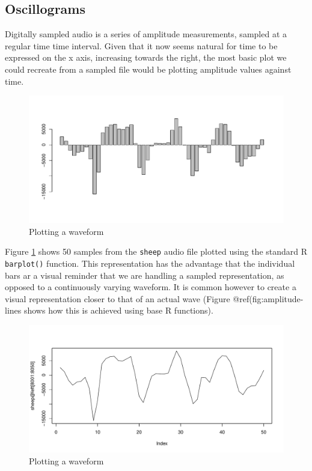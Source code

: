 \documentclass[
]{book}
\begin{document}
\hypertarget{oscillograms}{%
\subsection{Oscillograms}\label{oscillograms}}

Digitally sampled audio is a series of amplitude measurements, sampled at a regular time time interval. Given that it now seems natural for time to be expressed on the x axis, increasing towards the right, the most basic plot we could recreate from a sampled file would be plotting amplitude values against time.

\begin{figure}

{\centering \includegraphics[width=0.9\linewidth]{_main_files/figure-latex/amplitude-bars-1} 

}

\caption{Plotting a waveform}\label{fig:amplitude-bars}
\end{figure}

Figure \ref{fig:amplitude-bars} shows 50 samples from the \texttt{sheep} audio file plotted using the standard R \texttt{barplot()} function. This representation has the advantage that the individual bars ar a visual reminder that we are handling a sampled representation, as opposed to a continuously varying waveform. It is common however to create a visual representation closer to that of an actual wave (Figure @ref(fig:amplitude-lines shows how this is achieved using base R functions).

\begin{figure}

{\centering \includegraphics[width=0.9\linewidth]{_main_files/figure-latex/amplitude-lines-1} 

}

\caption{Plotting a waveform}\label{fig:amplitude-lines}
\end{figure}
\end{document}
